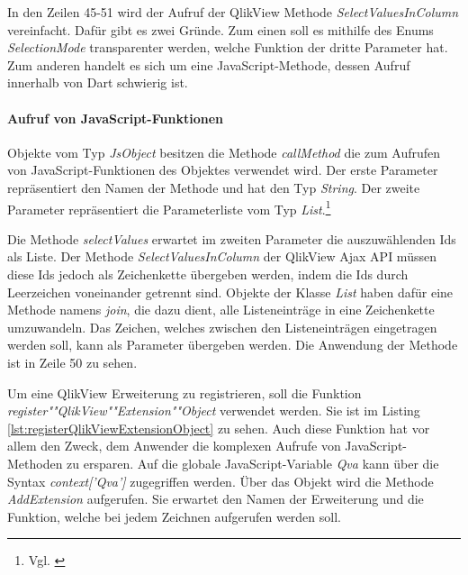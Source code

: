In den Zeilen 45-51 wird der Aufruf der QlikView Methode \textit{SelectValuesInColumn} vereinfacht. Dafür gibt es zwei Gründe. Zum einen soll es mithilfe des Enums \textit{SelectionMode} transparenter werden, welche Funktion der dritte Parameter hat. Zum anderen handelt es sich um eine JavaScript-Methode, dessen Aufruf innerhalb von Dart schwierig ist.


\paragraph{Aufruf von JavaScript-Funktionen} 
Objekte vom Typ \textit{JsObject} besitzen die Methode \textit{callMethod} die zum Aufrufen von JavaScript-Funktionen des Objektes verwendet wird. Der erste Parameter repräsentiert den Namen der Methode und hat den Typ \textit{String}. Der zweite Parameter repräsentiert die Parameterliste vom Typ \textit{List}.\footnote{Vgl. \cite{DartJsCallMethod}}

Die Methode \textit{selectValues} erwartet im zweiten Parameter die auszuwählenden Ids als Liste. Der Methode \textit{SelectValuesInColumn} der QlikView Ajax API müssen diese Ids jedoch als Zeichenkette übergeben werden, indem die Ids durch Leerzeichen voneinander getrennt sind. Objekte der Klasse \textit{List} haben dafür eine Methode namens \textit{join}, die dazu dient, alle Listeneinträge in eine Zeichenkette umzuwandeln. Das Zeichen, welches zwischen den Listeneinträgen eingetragen werden soll, kann als Parameter übergeben werden. Die Anwendung der Methode ist in Zeile 50 zu sehen.

Um eine QlikView Erweiterung zu registrieren, soll die Funktion \textit{register""QlikView""Extension""Object} verwendet werden. Sie ist im Listing \ref{lst:registerQlikViewExtensionObject} zu sehen. Auch diese Funktion hat vor allem den Zweck, dem Anwender die komplexen Aufrufe von JavaScript-Methoden zu ersparen. Auf die globale JavaScript-Variable \textit{Qva} kann über die Syntax \textit{context['Qva']} zugegriffen werden. Über das Objekt wird die Methode \textit{AddExtension} aufgerufen. Sie erwartet den Namen der Erweiterung und die Funktion, welche bei jedem Zeichnen aufgerufen werden soll. 

